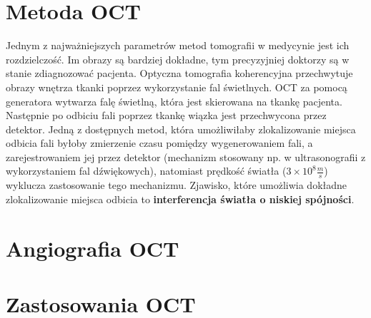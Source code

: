 
\section{Metoda OCT}
\label{sec:obrazowanie_oct:metoda_oct}

Jednym z najważniejszych parametrów metod tomografii w medycynie jest ich rozdzielczość. Im obrazy są bardziej dokładne, tym precyzyjniej doktorzy są w stanie zdiagnozować pacjenta. Optyczna tomografia koherencyjna przechwytuje obrazy wnętrza tkanki poprzez wykorzystanie fal świetlnych. OCT za pomocą generatora wytwarza falę świetlną, która jest skierowana na tkankę pacjenta. Następnie po odbiciu fali poprzez tkankę wiązka jest przechwycona przez detektor. Jedną z dostępnych metod, która umożliwiłaby zlokalizowanie miejsca odbicia fali byłoby zmierzenie czasu pomiędzy wygenerowaniem fali, a zarejestrowaniem jej przez detektor (mechanizm stosowany np. w ultrasonografii z wykorzystaniem fal dźwiękowych), natomiast prędkość światła (\(3\times10^8 \frac{m}{s}\)) wyklucza zastosowanie tego mechanizmu. Zjawisko, które umożliwia dokładne zlokalizowanie miejsca odbicia to \textbf{interferencja światła o niskiej spójności}.



\section{Angiografia OCT}
\label{sec:obrazowanie_oct:angiografia_oct}


\section{Zastosowania OCT}
\label{sec:obrazowanie_oct:zastosowania_oct}















